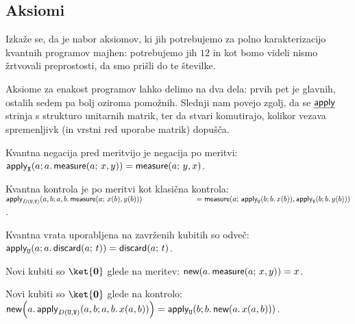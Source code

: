 \subsection{Aksiomi}
Izkaže se, da je nabor aksiomov, ki jih potrebujemo za polno karakterizacijo kvantnih programov majhen: potrebujemo jih \(12\) in kot bomo videli nismo žrtvovali preprostosti, da smo prišli do te številke.

Aksiome za enakost programov\cite{algeff-lin-qpl} lahko delimo na dva dela: prvih pet je glavnih, ostalih sedem pa bolj  oziroma pomožnih.
Slednji nam povejo zgolj, da se \(\eff{apply}\) strinja s strukturo unitarnih matrik,
ter da stvari komutirajo, kolikor vezava spremenljivk (in vrstni red uporabe matrik) dopušča.

\begin{axiom}{Kvantna negacija pred meritvijo je negacija po meritvi:}\label{ax:A}
    \( \tapply{X}{a}{\tmeasure{a}{x}{y}} = \tmeasure{a}{y}{x} \).
\end{axiom}

\begin{axiom}{Kvantna kontrola je po meritvi kot klasična kontrola:}\label{ax:B}
    \( \tapplyd{U, V}{a,b}{\tmeasure{a}{x(b)}{y(b)}}\\
       \text{\hspace{7em}} = \tmeasure{a}{\tapply{U}{b}{x(b)}}{\tapply{V}{b}{y(b)}} \).
\end{axiom}

\begin{axiom}{Kvantna vrata uporabljena na zavrženih kubitih so odveč:}\label{ax:C}
    \( \tapply{U}{a}{\tdiscard{a}{t}} = \tdiscard{a}{t} \).
\end{axiom}

\begin{axiom}{Novi kubiti so \( \ket{\mb0} \) glede na meritev:}\label{ax:D}
    \( \tnew{a}{\tmeasure{a}{x}{y}} = x \).
\end{axiom}

\begin{axiom}{Novi kubiti so \( \ket{\mb0} \) glede na kontrolo:}\label{ax:E}
    \( \tnew{a}{\tapplyd{U,V}{a,b}{x{\p{a,b}}}} = \tapply{U}{b}{\tnew{a}{x{\p{a,b}}}} \).
\end{axiom}

